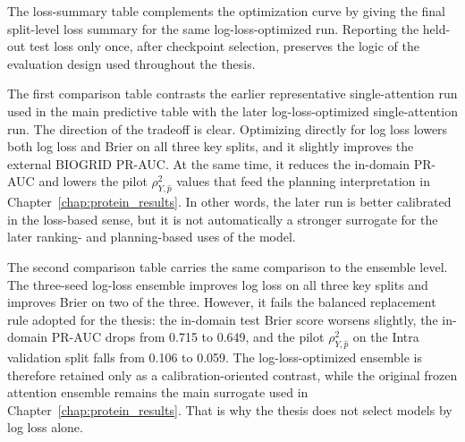 
The loss-summary table complements the optimization curve by giving the final split-level loss summary for the same log-loss-optimized run. Reporting the held-out test loss only once, after checkpoint selection, preserves the logic of the evaluation design used throughout the thesis.


The first comparison table contrasts the earlier representative single-attention run used in the main predictive table with the later log-loss-optimized single-attention run. The direction of the tradeoff is clear. Optimizing directly for log loss lowers both log loss and Brier on all three key splits, and it slightly improves the external BIOGRID PR-AUC. At the same time, it reduces the in-domain PR-AUC and lowers the pilot \(\rho_{Y,\hat p}^2\) values that feed the planning interpretation in Chapter~\ref{chap:protein_results}. In other words, the later run is better calibrated in the loss-based sense, but it is not automatically a stronger surrogate for the later ranking- and planning-based uses of the model.


The second comparison table carries the same comparison to the ensemble level. The three-seed log-loss ensemble improves log loss on all three key splits and improves Brier on two of the three. However, it fails the balanced replacement rule adopted for the thesis: the in-domain test Brier score worsens slightly, the in-domain PR-AUC drops from 0.715 to 0.649, and the pilot \(\rho_{Y,\hat p}^2\) on the Intra validation split falls from 0.106 to 0.059. The log-loss-optimized ensemble is therefore retained only as a calibration-oriented contrast, while the original frozen attention ensemble remains the main surrogate used in Chapter~\ref{chap:protein_results}. That is why the thesis does not select models by log loss alone.
